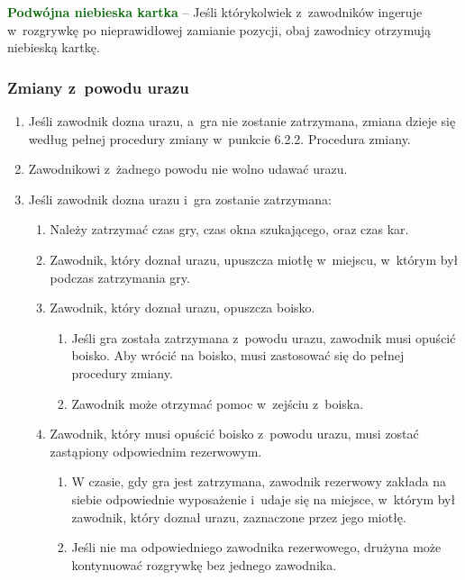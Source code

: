 \documentclass[12pt,a4paper]{article}
\newcommand\other[1]{\bgroup\textcolor{darkgreen}{\textbf{#1}}}
\begin{document}
\other{Podwójna niebieska kartka} -- Jeśli którykolwiek z~zawodników
ingeruje w~rozgrywkę po nieprawidłowej zamianie pozycji, obaj zawodnicy
otrzymują niebieską kartkę.

\subsubsection{Zmiany z~powodu urazu}

\begin{enumerate}
	\item
	      Jeśli zawodnik dozna urazu, a~gra nie zostanie zatrzymana, zmiana
	      dzieje się według pełnej procedury zmiany w~punkcie 6.2.2. Procedura
	      zmiany.
	\item
	      Zawodnikowi z~żadnego powodu nie wolno udawać urazu.
	\item
	      Jeśli zawodnik dozna urazu i~gra zostanie zatrzymana:

	      \begin{enumerate}
		      \item
		            Należy zatrzymać czas gry, czas okna szukającego, oraz czas kar.
		      \item
		            Zawodnik, który doznał urazu, upuszcza miotłę w~miejscu, w~którym
		            był podczas zatrzymania gry.
		      \item
		            Zawodnik, który doznał urazu, opuszcza boisko.

		            \begin{enumerate}
			            \item
			                  Jeśli gra została zatrzymana z~powodu urazu, zawodnik musi opuścić
			                  boisko. Aby wrócić na boisko, musi zastosować się do pełnej
			                  procedury zmiany.
			            \item
			                  Zawodnik może otrzymać pomoc w~zejściu z~boiska.
		            \end{enumerate}
		      \item
		            Zawodnik, który musi opuścić boisko z~powodu urazu, musi zostać
		            zastąpiony odpowiednim rezerwowym.

		            \begin{enumerate}
			            \item
			                  W czasie, gdy gra jest zatrzymana, zawodnik rezerwowy zakłada na
			                  siebie odpowiednie wyposażenie i~udaje się na miejsce, w~którym
			                  był zawodnik, który doznał urazu, zaznaczone przez jego miotłę.
			            \item
			                  Jeśli nie ma odpowiedniego zawodnika rezerwowego, drużyna może
			                  kontynuować rozgrywkę bez jednego zawodnika.
		            \end{enumerate}
	      \end{enumerate}
\end{enumerate}
\end{document}

